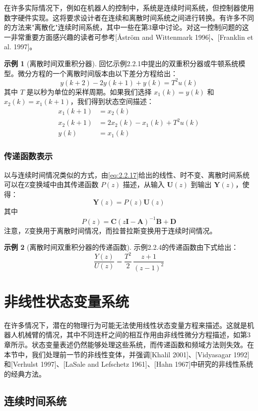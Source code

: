 \documentclass[UTF8,12pt,a4paper]{ctexart}
\theoremstyle{definition}
\newtheorem{example}{示例}[section]
\begin{document}
在许多实际情况下，例如在机器人的控制中，系统是连续时间系统，但控制器使用数字硬件实现。这将要求设计者在连续和离散时间系统之间进行转换。有许多不同的方法来"离散化"连续时间系统，其中一些在第3章中讨论。对这一控制问题的这一非常重要方面感兴趣的读者可参考[Åström and Wittenmark 1996]、[Franklin et al. 1997]。

\begin{example}[离散时间双重积分器]
回忆示例2.2.1中提出的双重积分器或牛顿系统模型。微分方程的一个离散时间版本由以下差分方程给出：
\[
y(k+2) - 2y(k+1) + y(k) = T^2 u(k)
\]
其中 $T$ 是以秒为单位的采样周期。如果我们选择 $x_1(k)=y(k)$ 和 $x_2(k)=x_1(k+1)$，我们得到状态空间描述：
\[
\begin{aligned}
x_1(k+1) &= x_2(k) \\
x_2(k+1) &= 2x_2(k) - x_1(k) + T^2 u(k) \\
y(k) &= x_1(k)
\end{aligned}
\]
\end{example}

\subsubsection{传递函数表示}

以与连续时间情况类似的方式，由\eqref{eq:2.2.17}给出的线性、时不变、离散时间系统可以在Z变换域中由其传递函数 $P(z)$ 描述，从输入 $\mathbf{U}(z)$ 到输出 $\mathbf{Y}(z)$，使得：
\[
\mathbf{Y}(z) = P(z)\mathbf{U}(z)
\]
其中
\[
P(z) = \mathbf{C}(z\mathbf{I}-\mathbf{A})^{-1}\mathbf{B} + \mathbf{D}
\]
注意，Z变换用于离散时间情况，而拉普拉斯变换用于连续时间情况。

\begin{example}[离散时间双重积分器的传递函数]
示例2.2.4的传递函数由下式给出：
\[
\frac{Y(z)}{U(z)} = \frac{T^2}{2}\,\frac{z+1}{(z-1)^2}
\]
\end{example}

\section{非线性状态变量系统}

在许多情况下，潜在的物理行为可能无法使用线性状态变量方程来描述。这就是机器人机械臂的情况，其中不同连杆之间的相互作用由非线性微分方程描述，如第3章所示。状态变量表述仍然能够处理这些系统，而传递函数和频域方法则失效。在本节中，我们处理前一节的非线性变体，并强调[Khalil 2001]、[Vidyasagar 1992]和[Verhulst 1997]、[LaSale and Lefschetz 1961]、[Hahn 1967]中研究的非线性系统的经典方法。

\subsection{连续时间系统}
\end{document}
